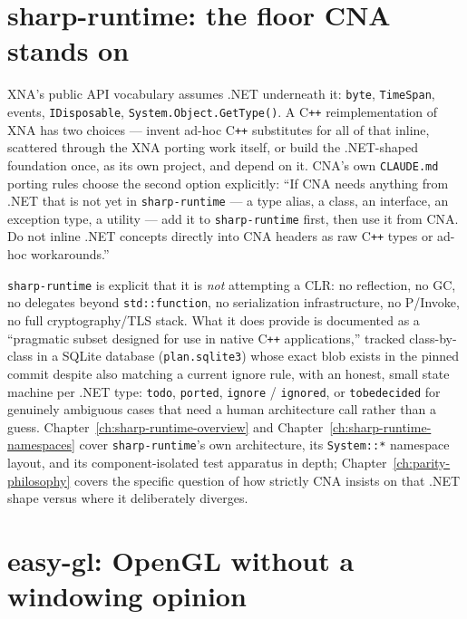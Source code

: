\section{sharp-runtime: the floor CNA stands on}
\label{sec:sharp-runtime-intro}

XNA's public API vocabulary assumes .NET underneath it: \texttt{byte}, \texttt{TimeSpan},
events, \texttt{IDisposable}, \texttt{System.Object.GetType()}. A C\texttt{++} reimplementation
of XNA has two choices --- invent ad-hoc C\texttt{++} substitutes for all of that inline,
scattered through the XNA porting work itself, or build the .NET-shaped foundation once, as
its own project, and depend on it. CNA's own \texttt{CLAUDE.md} porting rules choose the
second option explicitly: ``If CNA needs anything from .NET that is not yet in
\texttt{sharp-runtime} --- a type alias, a class, an interface, an exception type, a utility
--- add it to \texttt{sharp-runtime} first, then use it from CNA. Do not inline .NET concepts
directly into CNA headers as raw C\texttt{++} types or ad-hoc workarounds.''

\texttt{sharp-runtime} is explicit that it is \emph{not} attempting a CLR: no reflection, no
GC, no delegates beyond \texttt{std::function}, no serialization infrastructure, no P/Invoke,
no full cryptography/TLS stack. What it does provide is documented as a ``pragmatic subset
designed for use in native C\texttt{++} applications,'' tracked class-by-class in a SQLite
database (\texttt{plan.sqlite3}) whose exact blob exists in the pinned commit despite also
matching a current ignore rule, with an honest, small state machine
per .NET type: \texttt{todo}, \texttt{ported}, \texttt{ignore} / \texttt{ignored}, or
\texttt{tobedecided} for genuinely ambiguous cases that need a human architecture call rather
than a guess. Chapter~\ref{ch:sharp-runtime-overview} and Chapter~\ref{ch:sharp-runtime-namespaces}
cover \texttt{sharp-runtime}'s own architecture, its \texttt{System::*} namespace layout, and its
component-isolated test apparatus in depth; Chapter~\ref{ch:parity-philosophy} covers the specific
question of how strictly CNA insists on that .NET shape versus where it deliberately diverges.

\section{easy-gl: OpenGL without a windowing opinion}

